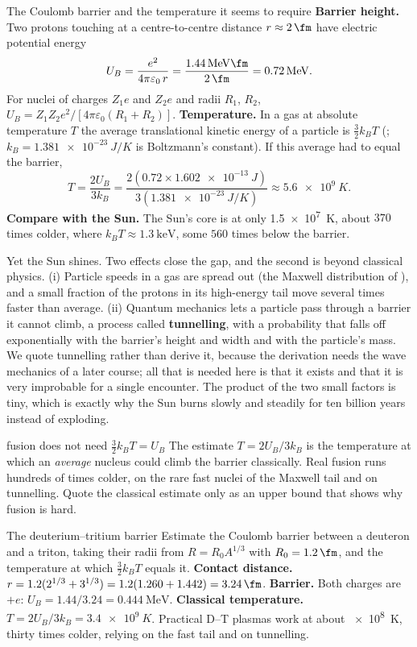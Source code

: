 \begin{derivbox}{The Coulomb barrier and the temperature it seems to require}
 \textbf{Barrier height.} Two protons touching at a centre-to-centre distance $r\approx\SI{2}{\fm}$
have electric potential energy
\[
U_B=\frac{e^2}{4\pi\varepsilon_0\,r}=\frac{\SI{1.44}{\MeV\fm}}{\SI{2}{\fm}}=\SI{0.72}{\MeV}.
\]
For nuclei of charges $Z_1e$ and $Z_2e$ and radii $R_1$, $R_2$, $U_B=Z_1Z_2e^2/[4\pi\varepsilon_0(R_1+R_2)]$.
 \textbf{Temperature.} In a gas at absolute temperature $T$ the average translational kinetic
energy of a particle is $\tfrac32k_BT$ (; $k_B=\SI{1.381e-23}{J/K}$ is Boltzmann's
constant). If this average had to equal the barrier,
\[
T=\frac{2U_B}{3k_B}=\frac{2(0.72\times\SI{1.602e-13}{J})}{3(\SI{1.381e-23}{J/K})}\approx\SI{5.6e9}{K}.
\]
 \textbf{Compare with the Sun.} The Sun's core is at only \SI{1.5e7}{K}, about $370$ times
colder, where $k_BT\approx\SI{1.3}{\keV}$, some $560$ times below the barrier.
\end{derivbox}

Yet the Sun shines. Two effects close the gap, and the second is beyond classical physics. (i) Particle
speeds in a gas are spread out (the Maxwell distribution of ), and a small fraction of
the protons in its high-energy tail move several times faster than average. (ii) Quantum mechanics lets a
particle pass through a barrier it cannot climb, a process called \textbf{tunnelling}, with a probability
that falls off exponentially with the barrier's height and width and with the particle's mass. We quote
tunnelling rather than derive it, because the derivation needs the wave mechanics of a later course; all
that is needed here is that it exists and that it is very improbable for a single encounter. The
product of the two small factors is tiny, which is exactly why the Sun burns slowly and steadily for ten
billion years instead of exploding.

\begin{trapbox}{fusion does not need $\tfrac32k_BT=U_B$}
The estimate $T=2U_B/3k_B$ is the temperature at which an \emph{average} nucleus could climb the barrier
classically. Real fusion runs hundreds of times colder, on the rare fast nuclei of the Maxwell tail and on
tunnelling. Quote the classical estimate only as an upper bound that shows why fusion is hard.
\end{trapbox}

\begin{exbox}{The deuterium--tritium barrier}\label{ex:react-dtbarrier}
Estimate the Coulomb barrier between a deuteron and a triton, taking their radii from
$R=R_0A^{1/3}$ with $R_0=\SI{1.2}{\fm}$, and the temperature at which $\tfrac32k_BT$ equals it.
 \textbf{Contact distance.} $r=1.2(2^{1/3}+3^{1/3})=1.2(1.260+1.442)=\SI{3.24}{\fm}$.
 \textbf{Barrier.} Both charges are $+e$: $U_B=1.44/3.24=\SI{0.444}{\MeV}$.
 \textbf{Classical temperature.} $T=2U_B/3k_B=\SI{3.4e9}{K}$. Practical D--T plasmas work at
about \SI{e8}{K}, thirty times colder, relying on the fast tail and on tunnelling.
\end{exbox}

